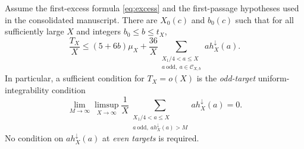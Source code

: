 \begin{theorem}\label{thm:odd}
Assume the first-excess formula \eqref{eq:excess} and the
first-passage hypotheses used in the consolidated manuscript.
There are $X_0(c)$ and $b_0(c)$ such that for all sufficiently large
$X$ and integers $b_0\le b\le t_X$,
\begin{equation}\label{eq:oddmain}
\boxed{\displaystyle
 \frac{T_X}{X}\le(5+6b)\mu_X+
 \frac{36}{X}\sum_{\substack{X_1/4<a\le X\\
             a\ \mathrm{odd},\ a\in\mathcal C_{X,b}}}
         a h_X^{\downarrow}(a).}
\end{equation}
In particular, a sufficient condition for $T_X=o(X)$ is the
\emph{odd-target} uniform-integrability condition
\begin{equation}\label{eq:oddUI}
 \lim_{M\to\infty}\limsup_{X\to\infty}
 \frac1X\sum_{\substack{X_1/4<a\le X\\
 a\ \mathrm{odd},\ a h_X^{\downarrow}(a)>M}}
 a h_X^{\downarrow}(a)=0.
\end{equation}
No condition on $a h_X^{\downarrow}(a)$ at \emph{even targets}
is required.
\end{theorem}

